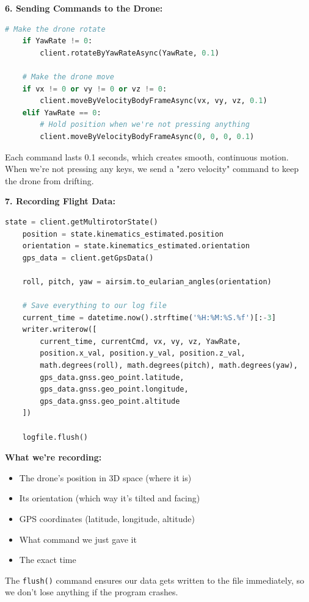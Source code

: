 \textbf{6. Sending Commands to the Drone:}
\begin{lstlisting}[language=Python]
    # Make the drone rotate
    if YawRate != 0:
        client.rotateByYawRateAsync(YawRate, 0.1)
        
    # Make the drone move
    if vx != 0 or vy != 0 or vz != 0:
        client.moveByVelocityBodyFrameAsync(vx, vy, vz, 0.1)
    elif YawRate == 0:
        # Hold position when we're not pressing anything
        client.moveByVelocityBodyFrameAsync(0, 0, 0, 0.1)
\end{lstlisting}

Each command lasts 0.1 seconds, which creates smooth, continuous motion. When we're not pressing any keys, we send a "zero velocity" command to keep the drone from drifting.

\textbf{7. Recording Flight Data:}
\begin{lstlisting}[language=Python]
    state = client.getMultirotorState()
    position = state.kinematics_estimated.position
    orientation = state.kinematics_estimated.orientation
    gps_data = client.getGpsData()
    
    roll, pitch, yaw = airsim.to_eularian_angles(orientation)
    
    # Save everything to our log file
    current_time = datetime.now().strftime('%H:%M:%S.%f')[:-3]
    writer.writerow([
        current_time, currentCmd, vx, vy, vz, YawRate,
        position.x_val, position.y_val, position.z_val,
        math.degrees(roll), math.degrees(pitch), math.degrees(yaw),
        gps_data.gnss.geo_point.latitude,
        gps_data.gnss.geo_point.longitude,
        gps_data.gnss.geo_point.altitude
    ])
    
    logfile.flush()
\end{lstlisting}

\textbf{What we're recording:}
\begin{itemize}
	\item The drone's position in 3D space (where it is)
	\item Its orientation (which way it's tilted and facing)
	\item GPS coordinates (latitude, longitude, altitude)
	\item What command we just gave it
	\item The exact time
\end{itemize}

The \texttt{flush()} command ensures our data gets written to the file immediately, so we don't lose anything if the program crashes.

